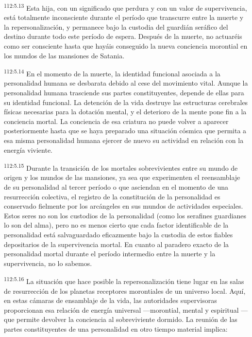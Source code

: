 \documentclass[twoside, 11pt]{book}
\begin{document}
\par
\textsuperscript{112:5.13} Esta hija, con un significado que perdura y con un valor de supervivencia, está totalmente inconsciente durante el período que transcurre entre la muerte y la repersonalización, y permanece bajo la custodia del guardián seráfico del destino durante todo este período de espera. Después de la muerte, no actuaréis como ser consciente hasta que hayáis conseguido la nueva conciencia morontial en los mundos de las mansiones de Satania.

\par
\textsuperscript{112:5.14} En el momento de la muerte, la identidad funcional asociada a la personalidad humana se desbarata debido al cese del movimiento vital. Aunque la personalidad humana trasciende sus partes constituyentes, depende de ellas para su identidad funcional. La detención de la vida destruye las estructuras cerebrales físicas necesarias para la dotación mental, y el deterioro de la mente pone fin a la conciencia mortal. La conciencia de esa criatura no puede volver a aparecer posteriormente hasta que se haya preparado una situación cósmica que permita a esa misma personalidad humana ejercer de nuevo su actividad en relación con la energía viviente.

\par
\textsuperscript{112:5.15} Durante la transición de los mortales sobrevivientes entre su mundo de origen y los mundos de las mansiones, ya sea que experimenten el reensamblaje de su personalidad al tercer período o que asciendan en el momento de una resurrección colectiva, el registro de la constitución de la personalidad es conservado fielmente por los arcángeles en sus mundos de actividades especiales. Estos seres no son los custodios de la personalidad (como los serafines guardianes lo son del alma), pero no es menos cierto que cada factor identificable de la personalidad está salvaguardado eficazmente bajo la custodia de estos fiables depositarios de la supervivencia mortal. En cuanto al paradero exacto de la personalidad mortal durante el período intermedio entre la muerte y la supervivencia, no lo sabemos.

\par
\textsuperscript{112:5.16} La situación que hace posible la repersonalización tiene lugar en las salas de resurrección de los planetas receptores morontiales de un universo local. Aquí, en estas cámaras de ensamblaje de la vida, las autoridades supervisoras proporcionan esa relación de energía universal ---morontial, mental y espiritual --- que permite devolver la conciencia al sobreviviente dormido. La reunión de las partes constituyentes de una personalidad en otro tiempo material implica:
\end{document}
